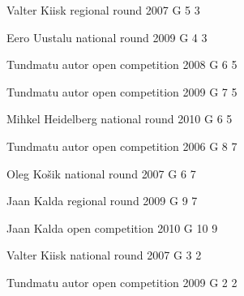 \documentclass[11pt]{article}
\begin{document}
\ylDisplay{} %
{Valter Kiisk} %
{regional round} %
{2007} %
{G 5} %
{3} %
{

\ifEngSolution
\fi
}

\ylDisplay{} %
{Eero Uustalu} %
{national round} %
{2009} %
{G 4} %
{3} %
{

\ifEngSolution
\fi
}

\ylDisplay{} %
{Tundmatu autor} %
{open competition} %
{2008} %
{G 6} %
{5} %
{

\ifEngSolution
\fi
}

\ylDisplay{} %
{Tundmatu autor} %
{open competition} %
{2009} %
{G 7} %
{5} %
{

\ifEngSolution
\fi
}

\ylDisplay{} %
{Mihkel Heidelberg} %
{national round} %
{2010} %
{G 6} %
{5} %
{

\ifEngSolution
\fi
}

\ylDisplay{} %
{Tundmatu autor} %
{open competition} %
{2006} %
{G 8} %
{7} %
{

\ifEngSolution
\fi
}

\ylDisplay{} %
{Oleg Košik} %
{national round} %
{2007} %
{G 6} %
{7} %
{

\ifEngSolution
\fi
}

\ylDisplay{} %
{Jaan Kalda} %
{regional round} %
{2009} %
{G 9} %
{7} %
{

\ifEngSolution
\fi
}

\ylDisplay{} %
{Jaan Kalda} %
{open competition} %
{2010} %
{G 10} %
{9} %
{

\ifEngSolution
\fi
}

\ylDisplay{} %
{Valter Kiisk} %
{national round} %
{2007} %
{G 3} %
{2} %
{

\ifEngSolution
\fi
}

\ylDisplay{} %
{Tundmatu autor} %
{open competition} %
{2009} %
{G 2} %
{2} %
{

\ifEngSolution
\fi
}
\end{document}
